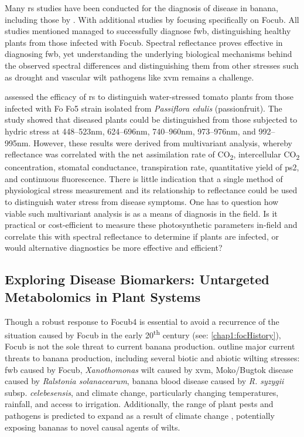 Many \ac{rs} studies have been conducted for the diagnosis of disease in banana, including those by \textcite{Johansen2014, Liao2018, Ochoa2016, Calou2020}. With additional studies by \textcite{Ye2020a, Ye2020b, Selvaraj2019, Zhang2022} focusing specifically on \ac{Focub}. All studies mentioned managed to successfully diagnose \ac{fwb}, distinguishing healthy plants from those infected with \ac{Focub}. Spectral reflectance proves effective in diagnosing \ac{fwb}, yet understanding the underlying biological mechanisms behind the observed spectral differences and distinguishing them from other stresses such as drought and vascular wilt pathogens like \ac{xvm} remains a challenge.

\textcite{Marin2020} assessed the efficacy of \ac{rs} to distinguish water-stressed tomato plants from those infected with \ac{Fo} Fo5 strain isolated from \textit{Passiflora edulis} (passionfruit). The study showed that diseased plants could be distinguished from those subjected to hydric stress at 448–523nm, 624–696nm, 740–960nm, 973–976nm, and 992–995nm. However, these results were derived from multivariant analysis, whereby reflectance was correlated with the net assimilation rate of CO\textsubscript{2}, intercellular CO\textsubscript{2} concentration, stomatal conductance, transpiration rate, quantitative yield of \ac{ps2}, and continuous fluorescence. There is little indication that a single method of physiological stress measurement and its relationship to reflectance could be used to distinguish water stress from disease symptoms. One has to question how viable such multivariant analysis is as a means of diagnosis in the field. Is it practical or cost-efficient to measure these photosynthetic parameters in-field and correlate this with spectral reflectance to determine if plants are infected, or would alternative diagnostics be more effective and efficient?   

\subsection{Exploring Disease Biomarkers: Untargeted Metabolomics in Plant Systems}

Though a robust response to \ac{Focub4} is essential to avoid a recurrence of the situation caused by \ac{Focub} in the early 20\textsuperscript{th} century (see: \ref{chap1:focHistory}), \ac{Focub} is not the sole threat to current banana production. \textcite{Ploetz2015c, Bebber2023} outline major current threats to banana production, including several biotic and abiotic wilting stresses: \ac{fwb} caused by \ac{Focub}, \textit{Xanothomonas} wilt caused by \acf{xvm}, Moko/Bugtok disease caused by \textit{Ralstonia solanacearum}, banana blood disease caused by \textit{R. syzygii} subsp. \textit{celebesensis}, and climate change, particularly changing temperatures, rainfall, and access to irrigation. Additionally, the range of plant pests and pathogens is predicted to expand as a result of climate change \parencite{Bebber2015}, potentially exposing bananas to novel causal agents of wilts.

